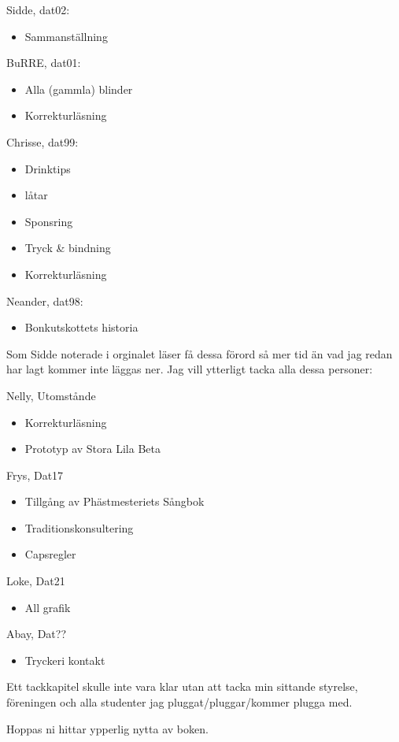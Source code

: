 Sidde, dat02:
\begin{itemize}
  \item Sammanställning
\end{itemize}
BuRRE, dat01:
\begin{itemize}
  \item Alla (gammla) blinder
  \item Korrekturläsning
\end{itemize}
Chrisse, dat99:
\begin{itemize}
  \item Drinktips
  \item låtar
  \item Sponsring
  \item Tryck \& bindning
  \item Korrekturläsning
\end{itemize}
Neander, dat98:
\begin{itemize}
  \item Bonkutskottets historia
\end{itemize}

Som Sidde noterade i orginalet läser få dessa förord så mer tid än vad jag redan
har lagt kommer inte läggas ner. Jag vill ytterligt tacka alla dessa personer:

Nelly, Utomstånde
\begin{itemize}
  \item Korrekturläsning
  \item Prototyp av Stora Lila Beta
\end{itemize}
Frys, Dat17
\begin{itemize}
  \item Tillgång av Phästmesteriets Sångbok
  \item Traditionskonsultering
  \item Capsregler
\end{itemize}
Loke, Dat21
\begin{itemize}
  \item All grafik
\end{itemize}
Abay, Dat??
\begin{itemize}
  \item Tryckeri kontakt
\end{itemize}

Ett tackkapitel skulle inte vara klar utan att tacka min sittande styrelse, föreningen och alla studenter jag pluggat/pluggar/kommer plugga med.

Hoppas ni hittar ypperlig nytta av boken.

\newpage

